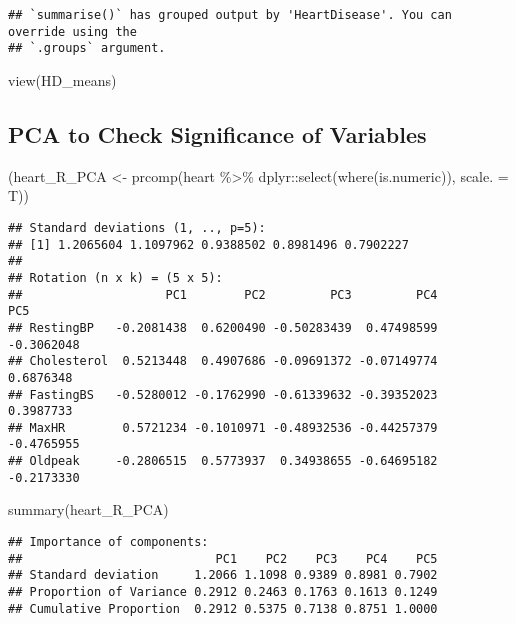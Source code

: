 \documentclass[
]{article}
\newenvironment{Shaded}{\begin{snugshade}}{\end{snugshade}}
\newcommand{\AttributeTok}[1]{\textcolor[rgb]{0.77,0.63,0.00}{#1}}
\newcommand{\FunctionTok}[1]{\textcolor[rgb]{0.00,0.00,0.00}{#1}}
\newcommand{\NormalTok}[1]{#1}
\newcommand{\OtherTok}[1]{\textcolor[rgb]{0.56,0.35,0.01}{#1}}
\newcommand{\SpecialCharTok}[1]{\textcolor[rgb]{0.00,0.00,0.00}{#1}}
\begin{document}
\begin{verbatim}
## `summarise()` has grouped output by 'HeartDisease'. You can override using the
## `.groups` argument.
\end{verbatim}

\begin{Shaded}
\begin{Highlighting}[]
\FunctionTok{view}\NormalTok{(HD\_means)}
\end{Highlighting}
\end{Shaded}

\hypertarget{pca-to-check-significance-of-variables}{%
\subsection{PCA to Check Significance of
Variables}\label{pca-to-check-significance-of-variables}}

\begin{Shaded}
\begin{Highlighting}[]
\NormalTok{(heart\_R\_PCA }\OtherTok{\textless{}{-}} \FunctionTok{prcomp}\NormalTok{(heart }\SpecialCharTok{\%\textgreater{}\%}\NormalTok{ dplyr}\SpecialCharTok{::}\FunctionTok{select}\NormalTok{(}\FunctionTok{where}\NormalTok{(is.numeric)),}
                      \AttributeTok{scale. =}\NormalTok{ T))}
\end{Highlighting}
\end{Shaded}

\begin{verbatim}
## Standard deviations (1, .., p=5):
## [1] 1.2065604 1.1097962 0.9388502 0.8981496 0.7902227
## 
## Rotation (n x k) = (5 x 5):
##                    PC1        PC2         PC3         PC4        PC5
## RestingBP   -0.2081438  0.6200490 -0.50283439  0.47498599 -0.3062048
## Cholesterol  0.5213448  0.4907686 -0.09691372 -0.07149774  0.6876348
## FastingBS   -0.5280012 -0.1762990 -0.61339632 -0.39352023  0.3987733
## MaxHR        0.5721234 -0.1010971 -0.48932536 -0.44257379 -0.4765955
## Oldpeak     -0.2806515  0.5773937  0.34938655 -0.64695182 -0.2173330
\end{verbatim}

\begin{Shaded}
\begin{Highlighting}[]
\FunctionTok{summary}\NormalTok{(heart\_R\_PCA)}
\end{Highlighting}
\end{Shaded}

\begin{verbatim}
## Importance of components:
##                           PC1    PC2    PC3    PC4    PC5
## Standard deviation     1.2066 1.1098 0.9389 0.8981 0.7902
## Proportion of Variance 0.2912 0.2463 0.1763 0.1613 0.1249
## Cumulative Proportion  0.2912 0.5375 0.7138 0.8751 1.0000
\end{verbatim}
\end{document}
